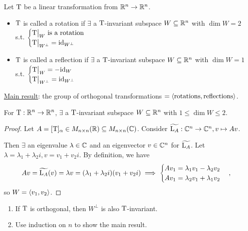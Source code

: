\begin{definition}
  Let $\rm T$ be a linear transformation from $\mathbb{R}^n \to \mathbb{R}^n$.
  \begin{itemize}
    \item $\rm T$ is called a rotation if $\exists$ a $\rm T$-invariant
      subspace $W \subseteq \mathbb{R}^n$ with $\dim W = 2$ s.t.
      $\begin{cases}
        {\rm T} \big|_W \text{~is a rotation} \\
        {\rm T} \big|_{W^\bot} = {\rm id}_{W^\bot}
      \end{cases}$
    \item $\rm T$ is called a reflection if $\exists$ a $\rm T$-invariant
      subspace $W \subseteq \mathbb{R}^n$ with $\dim W = 1$ s.t.
      $\begin{cases}
        {\rm T} \big|_W = -{\rm id}_W \\
        {\rm T} \big|_{W^\bot} = {\rm id}_{W^\bot}
      \end{cases}$
  \end{itemize}
\end{definition}

\underline{Main result}: the group of orthogonal transformations
$= \langle \text{rotations}, \text{reflections} \rangle$.

\begin{prop}
  For ${\rm T}: \mathbb{R}^n \to \mathbb{R}^n$, $\exists$ a $\rm T$-invariant
  subspace $W \subseteq \mathbb{R}^n$ with $1 \le \dim W \le 2$.
  \begin{proof}
    Let $A=[{\rm T}]_\alpha \in M_{n\times n}(\mathbb{R}) \subseteq M_{n\times n}(\mathbb{C})$.
    Consider $\widetilde{{\rm L}_A}: \mathbb{C}^n \to \mathbb{C}^n, v \mapsto Av$.

    Then $\exists$ an eigenvalue $\lambda \in \mathbb{C}$ and an eigenvector
    $v \in \mathbb{C}^n$ for $\widetilde{{\rm L}_A}$.
    Let $\lambda = \lambda_1 + \lambda_2 i, v = v_1 + v_2 i$. By definition,
    we have
    \[
      Av = \widetilde{{\rm L}_A}(v) = \lambda v =
      (\lambda_1 + \lambda_2 i)(v_1 + v_2 i)
      \implies \begin{cases}
        Av_1 = \lambda_1 v_1 - \lambda_2 v_2 \\
        Av_1 = \lambda_2 v_1 + \lambda_1 v_2
      \end{cases},
    \]
    so $W = \langle v_1, v_2 \rangle$.
  \end{proof}
\end{prop}

\begin{exercise} \mbox{}
  \begin{enumerate}
    \item If $\rm T$ is orthogonal, then $W^\bot$ is also $\rm T$-invariant.
    \item Use induction on $n$ to show the main result.
  \end{enumerate}
\end{exercise}

